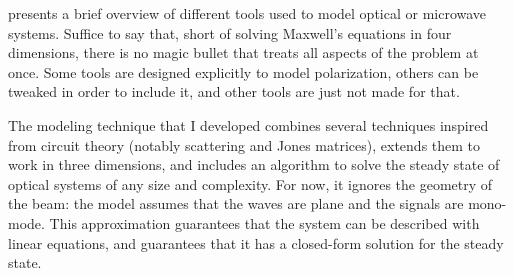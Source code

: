  presents a brief overview of different tools used to model optical or microwave systems.
Suffice to say that, short of solving Maxwell's equations in four dimensions, there is no magic bullet that treats all aspects of the problem at once.
Some tools are designed explicitly to model polarization, others can be tweaked in order to include it, and other tools are just not made for that.

The modeling technique that I developed combines several techniques inspired from circuit theory (notably scattering and Jones matrices), extends them to work in three dimensions, and includes an algorithm to solve the steady state of optical systems of any size and complexity.
For now, it ignores the geometry of the beam:
the model assumes that the waves are plane and the signals are mono-mode.
This approximation guarantees that the system can be described with linear equations, and guarantees that it has a closed-form solution for the steady state.

